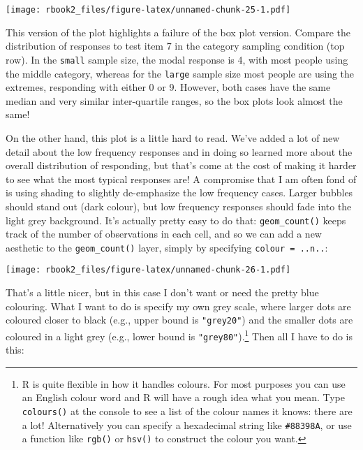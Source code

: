\documentclass[]{book}
\newenvironment{Shaded}{\begin{snugshade}}{\end{snugshade}}
\newcommand{\DataTypeTok}[1]{\textcolor[rgb]{0.13,0.29,0.53}{#1}}
\newcommand{\KeywordTok}[1]{\textcolor[rgb]{0.13,0.29,0.53}{\textbf{#1}}}
\newcommand{\NormalTok}[1]{#1}
\newcommand{\OperatorTok}[1]{\textcolor[rgb]{0.81,0.36,0.00}{\textbf{#1}}}
\newcommand{\StringTok}[1]{\textcolor[rgb]{0.31,0.60,0.02}{#1}}
\let\rmarkdownfootnote\footnote%
\def\footnote{\protect\rmarkdownfootnote}
\begin{document}
\texttt{[image: rbook2\_files/figure-latex/unnamed-chunk-25-1.pdf]}

This version of the plot highlights a failure of the box plot version. Compare the distribution of responses to test item 7 in the category sampling condition (top row). In the \texttt{small} sample size, the modal response is 4, with most people using the middle category, whereas for the \texttt{large} sample size most people are using the extremes, responding with either 0 or 9. However, both cases have the same median and very similar inter-quartile ranges, so the box plots look almost the same!

On the other hand, this plot is a little hard to read. We've added a lot of new detail about the low frequency responses and in doing so learned more about the overall distribution of responding, but that's come at the cost of making it harder to see what the most typical responses are! A compromise that I am often fond of is using shading to slightly de-emphasize the low frequency cases. Larger bubbles should stand out (dark colour), but low frequency responses should fade into the light grey background. It's actually pretty easy to do that: \texttt{geom\_count()} keeps track of the number of observations in each cell, and so we can add a new aesthetic to the \texttt{geom\_count()} layer, simply by specifying \texttt{colour\ =\ ..n..}:

\begin{Shaded}
\end{Shaded}

\texttt{[image: rbook2\_files/figure-latex/unnamed-chunk-26-1.pdf]}

That's a little nicer, but in this case I don't want or need the pretty blue colouring. What I want to do is specify my own grey scale, where larger dots are coloured closer to black (e.g., upper bound is \texttt{"grey20"}) and the smaller dots are coloured in a light grey (e.g., lower bound is \texttt{"grey80"}).\footnote{R is quite flexible in how it handles colours. For most purposes you can use an English colour word and R will have a rough idea what you mean. Type \texttt{colours()} at the console to see a list of the colour names it knows: there are a lot! Alternatively you can specify a hexadecimal string like \texttt{\#88398A}, or use a function like \texttt{rgb()} or \texttt{hsv()} to construct the colour you want.} Then all I have to do is this:
\end{document}
